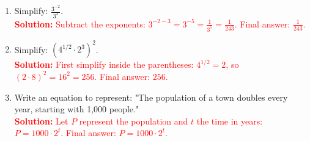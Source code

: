 \documentclass[9pt]{article}
\begin{document}
\begin{tcolorbox}[colframe=black!60, colback=white, 
coltitle=black, colbacktitle=black!15, fonttitle=\bfseries\Large, 
title=Exercises, halign title=center, left=10pt, right=10pt, top=10pt, bottom=60pt]
\begin{enumerate}[itemsep=3em]
    \item Simplify: \( \frac{3^{-2}}{3^3} \).\\
    \textcolor{red}{\textbf{Solution:} Subtract the exponents: \(3^{-2-3} = 3^{-5} = \frac{1}{3^5} = \frac{1}{243}\). Final answer: \(\frac{1}{243}\).}

    \item Simplify: \( (4^{1/2} \cdot 2^3)^2 \).\\
    \textcolor{red}{\textbf{Solution:} First simplify inside the parentheses: \(4^{1/2} = 2\), so \((2 \cdot 8)^2 = 16^2 = 256\). Final answer: \(256\).}

    \item Write an equation to represent: "The population of a town doubles every year, starting with 1,000 people."\\
    \textcolor{red}{\textbf{Solution:} Let \(P\) represent the population and \(t\) the time in years: \(P = 1000 \cdot 2^t\). Final answer: \(P = 1000 \cdot 2^t\).}
\end{enumerate}
\end{tcolorbox}
\end{document}
